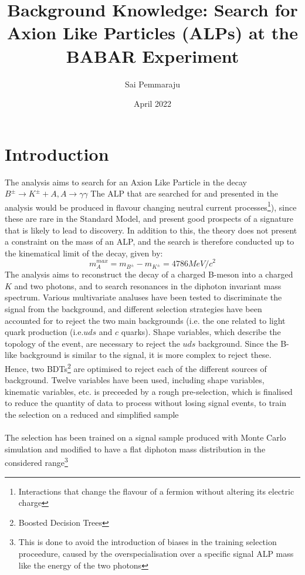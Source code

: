 \documentclass{article}
\title{\textbf{Background Knowledge: Search for Axion Like Particles (ALPs) at the BABAR Experiment}}
\author{Sai Pemmaraju}
\date{April 2022}
\begin{document}
\maketitle
\section{Introduction}
The analysis aims to search for an Axion Like Particle in the decay $B^{\pm}\rightarrow K^{\pm}+A, A\rightarrow \gamma\gamma$
The ALP that are searched for and presented in the analysis would be produced in flavour changing neutral current processes\footnote{Interactions that change the flavour of a fermion without altering its electric charge}), since these are rare in the Standard Model, and present good prospects of
a signature that is likely to lead to discovery. In addition to this, the theory does not present a constraint on the mass of an ALP, and the search is therefore conducted up to the kinematical limit of the decay, given by:
$$m^{max}_{A} = m_{B^{\pm}}-m_{K^{\pm}} = 4786 MeV/c^{2}$$
The analysis aims to reconstruct the decay of a charged B-meson into a charged $K$ and two photons, and to search resonances in the diphoton invariant mass spectrum. Various multivariate analuses have been tested to discriminate the signal from the background, and different selection strategies have been accounted for to reject the two main backgrounds
(i.e. the one related to light quark production (i.e.$uds$ and $c$ quarks). Shape variables, which describe the topology of the event, are necessary to reject the $uds$ background. Since the B-like background is similar to the signal, it is more complex to reject these.\\
Hence, two BDTs\footnote{Boosted Decision Trees} are optimised to reject each of the different sources of background. Twelve variables have been used, including shape variables, kinematic variables, etc. is preceeded by a rough pre-selection, which is finalised to reduce the quantity of data to process without losing signal events, to train the selection on a reduced and simplified sample\\
\\
The selection has been trained on a signal sample produced with Monte Carlo simulation and modified to have a flat diphoton mass distribution in the considered range\footnote{This is done to avoid the introduction of biases in the training selection proceedure, caused by the overspecialisation over a specific signal ALP mass like the energy of the two photons}
\end{document}
